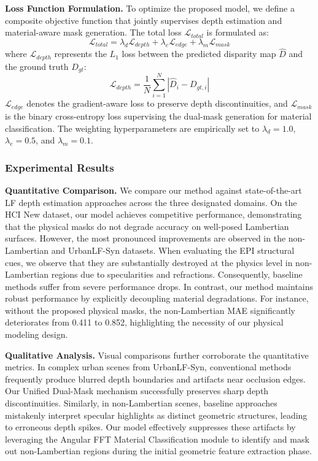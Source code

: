 \textbf{Loss Function Formulation.}
To optimize the proposed model, we define a composite objective function that jointly supervises depth estimation and material-aware mask generation. The total loss $\mathcal{L}_{total}$ is formulated as:
\begin{equation}
\label{eq:eq29}
\mathcal{L}_{total} = \lambda_{d} \mathcal{L}_{depth} + \lambda_{e} \mathcal{L}_{edge} + \lambda_{m} \mathcal{L}_{mask}
\end{equation}
where $\mathcal{L}_{depth}$ represents the $L_1$ loss between the predicted disparity map $\hat{D}$ and the ground truth $D_{gt}$:
\begin{equation}
\label{eq:eq30}
\mathcal{L}_{depth} = \frac{1}{N} \sum_{i=1}^{N} | \hat{D}_i - D_{gt, i} |
\end{equation}
$\mathcal{L}_{edge}$ denotes the gradient-aware loss to preserve depth discontinuities, and $\mathcal{L}_{mask}$ is the binary cross-entropy loss supervising the dual-mask generation for material classification. The weighting hyperparameters are empirically set to $\lambda_{d}=1.0$, $\lambda_{e}=0.5$, and $\lambda_{m}=0.1$.

\subsubsection{Experimental Results}

\textbf{Quantitative Comparison.}
We compare our method against state-of-the-art LF depth estimation approaches across the three designated domains. On the HCI New dataset, our model achieves competitive performance, demonstrating that the physical masks do not degrade accuracy on well-posed Lambertian surfaces. However, the most pronounced improvements are observed in the non-Lambertian and UrbanLF-Syn datasets. When evaluating the EPI structural cues, we observe that they are substantially destroyed at the physics level in non-Lambertian regions due to specularities and refractions. Consequently, baseline methods suffer from severe performance drops. In contrast, our method maintains robust performance by explicitly decoupling material degradations. For instance, without the proposed physical masks, the non-Lambertian MAE significantly deteriorates from 0.411 to 0.852, highlighting the necessity of our physical modeling design.

\textbf{Qualitative Analysis.}
Visual comparisons further corroborate the quantitative metrics. In complex urban scenes from UrbanLF-Syn, conventional methods frequently produce blurred depth boundaries and artifacts near occlusion edges. Our Unified Dual-Mask mechanism successfully preserves sharp depth discontinuities. Similarly, in non-Lambertian scenes, baseline approaches mistakenly interpret specular highlights as distinct geometric structures, leading to erroneous depth spikes. Our model effectively suppresses these artifacts by leveraging the Angular FFT Material Classification module to identify and mask out non-Lambertian regions during the initial geometric feature extraction phase.

